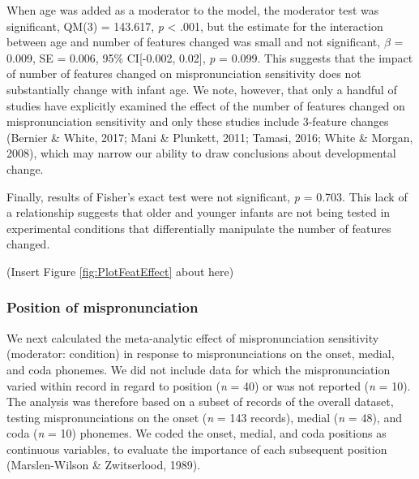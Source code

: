 \documentclass[man]{apa6}
\begin{document}
When age was added as a moderator to the model, the moderator test was significant, QM(3) = 143.617, \emph{p} \textless{} .001, but the estimate for the interaction between age and number of features changed was small and not significant, \(\beta\) = 0.009, SE = 0.006, 95\% CI{[}-0.002, 0.02{]}, \emph{p} = 0.099. This suggests that the impact of number of features changed on mispronunciation sensitivity does not substantially change with infant age. We note, however, that only a handful of studies have explicitly examined the effect of the number of features changed on mispronunciation sensitivity and only these studies include 3-feature changes (Bernier \& White, 2017; Mani \& Plunkett, 2011; Tamasi, 2016; White \& Morgan, 2008), which may narrow our ability to draw conclusions about developmental change.

Finally, results of Fisher's exact test were not significant, \emph{p} = 0.703. This lack of a relationship suggests that older and younger infants are not being tested in experimental conditions that differentially manipulate the number of features changed.

(Insert Figure \ref{fig:PlotFeatEffect} about here)

\hypertarget{position-of-mispronunciation}{%
\subsubsection{Position of mispronunciation}\label{position-of-mispronunciation}}

We next calculated the meta-analytic effect of mispronunciation sensitivity (moderator: condition) in response to mispronunciations on the onset, medial, and coda phonemes. We did not include data for which the mispronunciation varied within record in regard to position (\emph{n} = 40) or was not reported (\emph{n} = 10). The analysis was therefore based on a subset of records of the overall dataset, testing mispronunciations on the onset (\emph{n} = 143 records), medial (\emph{n} = 48), and coda (\emph{n} = 10) phonemes. We coded the onset, medial, and coda positions as continuous variables, to evaluate the importance of each subsequent position (Marslen-Wilson \& Zwitserlood, 1989).
\end{document}
